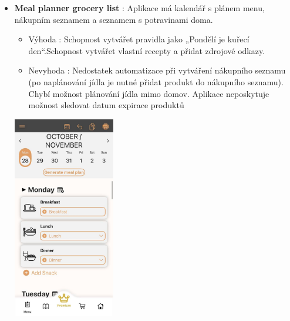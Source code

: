\documentclass[a4paper,12pt]{article}
\begin{document}
\begin{itemize}
    \item \textbf{Meal planner grocery list} : Aplikace má kalendář s plánem menu, nákupním seznamem a seznamem s potravinami doma.
    \begin{itemize}
        \item Výhoda : Schopnost vytvářet pravidla jako „Pondělí je kuřecí den“.Schopnost vytvářet vlastní recepty a přidat zdrojové odkazy.
        \item Nevyhoda : Nedostatek automatizace při vytváření nákupního seznamu (po naplánování jídla je nutné přidat produkt do nákupního seznamu). Chybí možnost plánování jídla mimo domov.  Aplikace neposkytuje možnost sledovat datum expirace produktů
    \end{itemize}
    \begin{center}
         \includegraphics[width=0.35\textwidth]{grocerylist.png} %
    \end{center}
    

\end{itemize}
\end{document}
